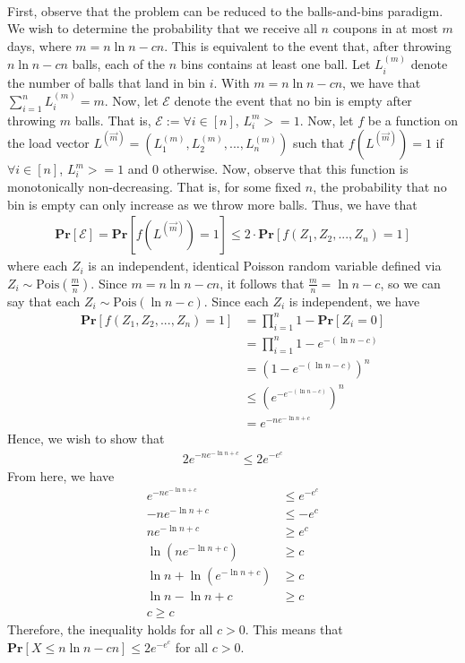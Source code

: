 \documentclass[12pt]{article}
\begin{document}
\begin{solution} \ \\
    First, observe that the problem can be reduced to the balls-and-bins paradigm. We wish to determine the probability that we receive all $n$ coupons in at most $m$ days, where $m = n\ln n - cn$. This is equivalent to the event that, after throwing $n\ln n - cn$ balls, each of the $n$ bins contains at least one ball. Let $L_i^{(m)}$ denote the number of balls that land in bin $i$. With $m = n\ln n - cn$, we have that $\sum\limits_{i=1}^n L_i^{(m)} = m$. Now, let $\mathcal{E}$ denote the event that no bin is empty after throwing $m$ balls. That is, $\mathcal{E} := \forall i \in [n]$, $L_i^{m} >= 1$. Now, let $f$ be a function on the load vector $L^{(\overrightarrow{m})} = (L_1^{(m)}, L_2^{(m)}, ..., L_n^{(m)})$ such that $f(L^{(\overrightarrow{m})}) = 1$ if $\forall i \in [n]$, $L_i^{m} >= 1$ and $0$ otherwise. Now, observe that this function is monotonically non-decreasing. That is, for some fixed $n$, the probability that no bin is empty can only increase as we throw more balls. Thus, we have that 
    \begin{align*}
        \textbf{Pr}[\mathcal{E}] = \textbf{Pr}[f(L^{(\overrightarrow{m})}) = 1] \leq 2 \cdot \textbf{Pr}[f(Z_1, Z_2, ..., Z_n) = 1]
    \end{align*}
    where each $Z_i$ is an independent, identical Poisson random variable defined via $Z_i \sim \text{Pois}(\frac{m}{n})$. Since $m = n \ln n - cn$, it follows that $\frac{m}{n} = \ln n - c$, so we can say that each $Z_i \sim \text{Pois}(\ln n - c)$. Since each $Z_i$ is independent, we have
    \begin{align*}
        \textbf{Pr}[f(Z_1, Z_2,...,Z_n) = 1] &= \prod\limits_{i=1}^n 1 - \textbf{Pr}[Z_i = 0] \\
        &= \prod\limits_{i=1}^n 1 - e^{-(\ln n - c)} \\
        &= \left(1 - e^{-(\ln n - c)}\right)^n \\
        &\leq \left(e^{-e^{-(\ln n - c)}}\right)^n \\
        &= e^{-ne^{- \ln n + c}}
    \end{align*}
    Hence, we wish to show that
    \begin{align*}
        2e^{-ne^{- \ln n + c}} \leq 2e^{-e^c}
    \end{align*}
    From here, we have
    \begin{align*}
        e^{-ne^{- \ln n + c}} &\leq e^{-e^c} \\
        -ne^{- \ln n + c} &\leq -e^c \\
        ne^{- \ln n + c} &\geq e^c \\
        \ln \left(ne^{- \ln n + c}\right) &\geq c \\
        \ln n + \ln\left(e^{- \ln n + c}\right) & \geq c \\
        \ln n - \ln n + c &\geq c \\
        c \geq c
    \end{align*}
    Therefore, the inequality holds for all $c > 0$. This means that $\textbf{Pr}[X \leq n\ln n - cn] \leq 2e^{-e^c}$ for all $c > 0$.
\end{solution}
\end{document}
